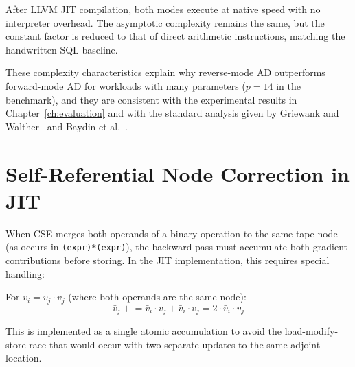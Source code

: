 \documentclass[12pt]{report}
\begin{document}
After LLVM JIT compilation, both modes execute at native speed with
no interpreter overhead. The asymptotic complexity remains the same,
but the constant factor is reduced to that of direct arithmetic
instructions, matching the handwritten SQL baseline.

These complexity characteristics explain why reverse-mode AD
outperforms forward-mode AD for workloads with many parameters
($p = 14$ in the benchmark), and they are consistent with the
experimental results in Chapter~\ref{ch:evaluation} and with the
standard analysis given by Griewank and Walther~\cite{griewank2008evaluating}
and Baydin et al.~\cite{baydin2017automatic}.

\section{Self-Referential Node Correction in JIT}

When CSE merges both operands of a binary operation to the same
tape node (as occurs in \texttt{(expr)*(expr)}), the backward pass
must accumulate both gradient contributions before storing. In the
JIT implementation, this requires special handling:

For $v_i = v_j \cdot v_j$ (where both operands are the same node):
\begin{equation}
\bar{v}_j \mathrel{+}= \bar{v}_i \cdot v_j + \bar{v}_i \cdot v_j
         = 2 \cdot \bar{v}_i \cdot v_j
\end{equation}

This is implemented as a single atomic accumulation to avoid the
load-modify-store race that would occur with two separate updates
to the same adjoint location.



\newpage
\end{document}
